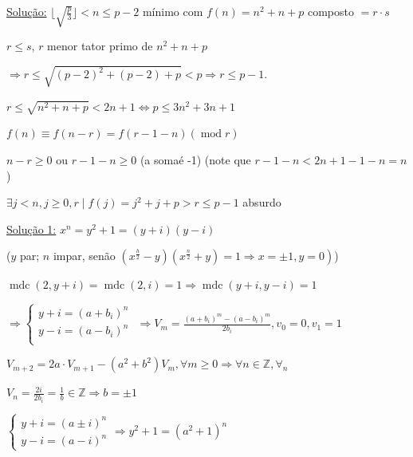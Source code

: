 \documentclass[a4paper,12pt]{article}
\renewcommand{\leq}{\ensuremath{\leqslant}}
\renewcommand{\geq}{\ensuremath{\geqslant}}
\theoremstyle{plain} %
\theoremstyle{definition} %
\theoremstyle{remark} %
\begin{document}
	\begin{framed}
		\underline{Solu\c{c}\~ao:} $\lfloor \sqrt{\frac{p}{3}} \rfloor <n\leq p-2$ m\'inimo com $f(n)=n^2+n+p$ composto $=r\cdot s$ 
		
		$r\leq s$, $r$ menor tator primo de $n^2+n+p$
		
		$\Rightarrow r\leq \sqrt{(p-2)^2+(p-2)+p}<p\Rightarrow r\leq p-1$.
		
		$r \leq \sqrt{n^{2}+n+p}<2 n+1 \Leftrightarrow p \leq 3 n^{2}+3 n+1$
		
		$f(n) \equiv f(n-r)=f(r-1-n)(\operatorname{mod} r)$
		
		$n-r \geq 0$ ou $r-1-n \geqslant 0$ (a soma\'e -1) (note que $r-1-n<2 n+1-1-n=n$)
		
		$\exists j<n, j \geqslant 0, r \mid f(j)=j^{2}+j+p>r \leq p-1$ absurdo \tiny\textblock
		
		\normalsize
		
		\underline{Solu\c{c}\~ao 1:} $x^{n}=y^{2}+1=(y+i)(y-i)$
		
		($y$ par; $n$ impar, sen\~ao $\left.\left(x^{\frac{h}{2}}-y\right)\left(x^{\frac{n}{2}}+y\right)=1 \Rightarrow x=\pm 1, y=0\right)$)
		
		$\operatorname{mdc}(2, y+i)=\operatorname{mdc}(2, i)=1 \Rightarrow \operatorname{mdc}(y+i, y-i)=1$
		
		\vspace{1ex}
		$\Rightarrow \left\{\begin{array}{l} 
			y+i=\left(a+b_{i}\right)^{n} \\ 
			y-i=(a-b_i)^{n}\\ 
		\end{array}\right.$ 
		$\Rightarrow V_{m}=\frac{\left(a+b_{i}\right)^{m}-\left(a-b_{i}\right)^{m}}{2 b_{i}}, v_{0}=0, v_{1}=1$
		\vspace{1ex}
		
		$V_{m+2}=2 a \cdot V_{m+1}-\left(a^{2}+b^{2}\right) V_{m}, \forall m \geqslant 0 \Rightarrow \forall n \in \mathds{Z}, \forall_{n}$
		
		$V_{n}=\frac{2 i}{2 b_{i}}=\frac{1}{b} \in \mathbb{Z} \Rightarrow b=\pm 1$
		
		\vspace{1ex}
		$\left\{\begin{array}{l} y+i=(a \pm i)^{n} \\ y-i=(a-i)^{n}\end{array} \Rightarrow y^{2}+1=\left(a^{2}+1\right)^{n}\right.$
		\vspace{1ex}
		

\end{framed}
\end{document}
